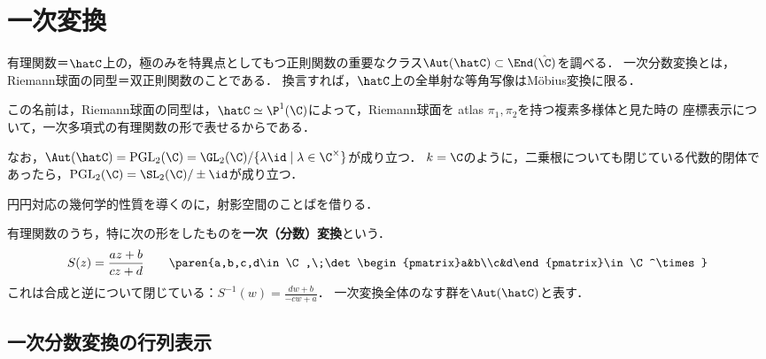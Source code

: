 \documentclass[uplatex, dvipdfmx]{jsreport}
\newcommand{\Pone}{\P^1(\C)}
\begin{document}
\section{一次変換}

\begin{screen}
    有理関数＝$\hatC$上の，極のみを特異点としてもつ正則関数の重要なクラス$\Aut(\hatC)\subset\End(\hat\C)$を調べる．
    一次分数変換とは，Riemann球面の同型＝双正則関数のことである．
    換言すれば，$\hatC$上の全単射な等角写像はMöbius変換に限る．

    この名前は，Riemann球面の同型は，$\hatC\simeq\Pone$によって，Riemann球面を
    atlas $\pi_1,\pi_2$を持つ複素多様体と見た時の
    座標表示について，一次多項式の有理関数の形で表せるからである．

    なお，$\Aut(\hatC)=\mathrm{PGL}_2(\C)=\GL_2(\C)/\{\lambda\id\mid\lambda\in\C^\times\}$が成り立つ．
    $k=\C$のように，二乗根についても閉じている代数的閉体であったら，$\mathrm{PGL}_2(\C)=\SL_2(\C)/\pm\id$が成り立つ．

    円円対応の幾何学的性質を導くのに，射影空間のことばを借りる．
\end{screen}

\begin{definition}
    有理関数のうち，特に次の形をしたものを\textbf{一次（分数）変換}という．
    \[S(z)=\frac{az+b}{cz+d}\qquad\paren{a,b,c,d\in\C,\;\det\begin{pmatrix}a&b\\c&d\end{pmatrix}\in\C^\times}\]
    これは合成と逆について閉じている：$S^{-1}(w)=\frac{dw+b}{-cw+a}$．
    一次変換全体のなす群を$\Aut(\hatC)$と表す．
\end{definition}

\subsection{一次分数変換の行列表示}
\end{document}
